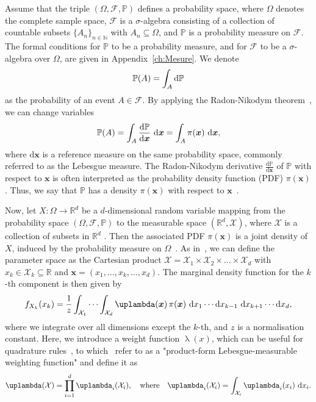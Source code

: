 Assume that the triple $(\Omega, \mathcal{F}, \mathbb{P})$ defines a probability space, where $\Omega$ denotes the complete sample space, $\mathcal{F}$ is a $\sigma$-algebra consisting of a collection of countable subsets $\{A_n\}_{n \in \mathbb{N}}$ with $A_n \subseteq \Omega$, and $\mathbb{P}$ is a probability measure on $\mathcal{F}$. The formal conditions for $\mathbb{P}$ to be a probability measure, and for $\mathcal{F}$ to be a $\sigma$-algebra over $\Omega$, are given in Appendix~\ref{ch:Mesure}.
We denote
\begin{align}
	\mathbb{P}(A) = \int_A \mathop{}\!\mathrm{d}  \mathbb{P}
\end{align}
as the probability of an event $A \in \mathcal{F}$.
By applying the Radon-Nikodym theorem~\cite{kopp2004measintprob}, we can change variables
\begin{align}
	\mathbb{P}(A) = \int_A \frac{\mathop{}\!\mathrm{d} \mathbb{P}}{\mathop{}\!\mathrm{d} \bm{x}} \, \mathop{}\!\mathrm{d} \bm{x} = \int_A \pi(\bm{x}) \, \mathop{}\!\mathrm{d} \bm{x},
\end{align}
where $\mathrm{d}\bm{x}$ is a reference measure on the same probability space, commonly referred to as the Lebesgue measure. 
The Radon-Nikodym derivative $\frac{\mathrm{d} \mathbb{P}}{\mathrm{d}\bm{x}}$ of $\mathbb{P}$ with respect to $\bm{x}$ is often interpreted as the probability density function (PDF) $\pi(\bm{x})$. Thus, we say that $\mathbb{P}$ has a density $\pi(\bm{x})$ with respect to $\bm{x}$~\cite[Chapter 10]{simonnet1996measprob}.

Now, let $X: \Omega \longrightarrow \mathbb{R}^d$ be a $d$-dimensional random variable mapping from the probability space $(\Omega, \mathcal{F}, \mathbb{P})$ to the measurable space $(\mathbb{R}^d, \mathcal{X})$, where $\mathcal{X}$ is a collection of subsets in $\mathbb{R}^d$ \cite{VesaInvLect}.
Then the associated PDF $\pi(\bm{x})$ is a joint density of $X$, induced by the probability measure on $\Omega$~\cite{VesaInvLect, kopp2004measintprob}.
As in~\cite{cui2022deep}, we can define the parameter space as the Cartesian product $\mathcal{X} = \mathcal{X}_1 \times \mathcal{X}_2 \times \dots \times \mathcal{X}_d$ with $ x_k \in \mathcal{X}_k \subseteq \mathbb{R}$ and $\bm{x} = ( x_1,\dots ,x_k,\dots,x_d )$.
The marginal density function for the $k$-th component is then given by
\begin{align}
	f_{X_k}(x_k) = \frac{1}{z} \int_{\mathcal{X}_1} \cdots \int_{\mathcal{X}_d} \uplambda(\bm{x}) \, \pi(\bm{x}) \, \diff x_1 \cdots \diff x_{k-1} \, \diff x_{k+1} \cdots \diff x_d, \label{eq:margInt}
\end{align}
where we integrate over all dimensions except the $k$-th, and $z$ is a normalisation constant.
Here, we introduce a weight function $\uplambda(x)$, which can be useful for quadrature rules~\cite{davis2007methods}, to which~\cite{cui2022deep} refer to as a "product-form Lebesgue-measurable weighting function" and define it as
\begin{align}
	\uplambda(\mathcal{X}) = \prod_{i = 1}^{d} \uplambda_i(\mathcal{X}_i), \quad \text{where} \quad \uplambda_i(\mathcal{X}_i) = \int_{\mathcal{X}_i} \uplambda_i(x_i) \, \diff x_i. \label{eq:lebesgueWeight}
\end{align}

